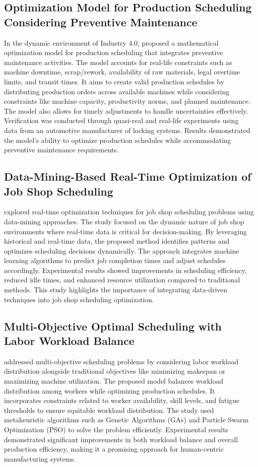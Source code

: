 \subsection{Optimization Model for Production Scheduling Considering Preventive Maintenance}
In the dynamic environment of Industry 4.0, \cite{optimization2023} proposed a mathematical optimization model for production scheduling that integrates preventive maintenance activities. The model accounts for real-life constraints such as machine downtime, scrap/rework, availability of raw materials, legal overtime limits, and transit times. It aims to create valid production schedules by distributing production orders across available machines while considering constraints like machine capacity, productivity norms, and planned maintenance. The model also allows for timely adjustments to handle uncertainties effectively. Verification was conducted through quasi-real and real-life experiments using data from an automotive manufacturer of locking systems. Results demonstrated the model's ability to optimize production schedules while accommodating preventive maintenance requirements.

\subsection{Data-Mining-Based Real-Time Optimization of Job Shop Scheduling}
\cite{datamining2022} explored real-time optimization techniques for job shop scheduling problems using data-mining approaches. The study focused on the dynamic nature of job shop environments where real-time data is critical for decision-making. By leveraging historical and real-time data, the proposed method identifies patterns and optimizes scheduling decisions dynamically. The approach integrates machine learning algorithms to predict job completion times and adjust schedules accordingly. Experimental results showed improvements in scheduling efficiency, reduced idle times, and enhanced resource utilization compared to traditional methods. This study highlights the importance of integrating data-driven techniques into job shop scheduling optimization.

\subsection{Multi-Objective Optimal Scheduling with Labor Workload Balance}
\cite{multiobjective2021} addressed multi-objective scheduling problems by considering labor workload distribution alongside traditional objectives like minimizing makespan or maximizing machine utilization. The proposed model balances workload distribution among workers while optimizing production schedules. It incorporates constraints related to worker availability, skill levels, and fatigue thresholds to ensure equitable workload distribution. The study used metaheuristic algorithms such as Genetic Algorithms (GAs) and Particle Swarm Optimization (PSO) to solve the problem efficiently. Experimental results demonstrated significant improvements in both workload balance and overall production efficiency, making it a promising approach for human-centric manufacturing systems.

